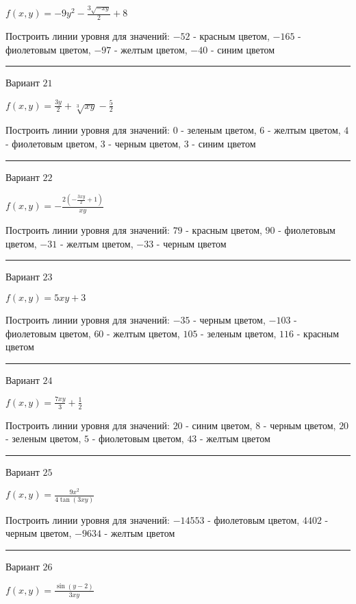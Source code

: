 \documentclass[11pt]{report}
\begin{document}
$f(x, y) = - 9 y^{2} - \frac{3 \sqrt{- x y}}{2} + 8$

Построить линии уровня для значений: $-52$ - красным цветом, $-165$ - фиолетовым цветом, $-97$ - желтым цветом, $-40$ - синим цветом
\begin{center}
\noindent\rule{8cm}{0.4pt}
\end{center}
Вариант $21$


$f(x, y) = \frac{3 y}{2} + \sqrt[3]{x y} - \frac{5}{2}$

Построить линии уровня для значений: $0$ - зеленым цветом, $6$ - желтым цветом, $4$ - фиолетовым цветом, $3$ - черным цветом, $3$ - синим цветом
\begin{center}
\noindent\rule{8cm}{0.4pt}
\end{center}
Вариант $22$


$f(x, y) = - \frac{2 \left(- \frac{3 x y}{2} + 1\right)}{x y}$

Построить линии уровня для значений: $79$ - красным цветом, $90$ - фиолетовым цветом, $-31$ - желтым цветом, $-33$ - черным цветом
\begin{center}
\noindent\rule{8cm}{0.4pt}
\end{center}
Вариант $23$


$f(x, y) = 5 x y + 3$

Построить линии уровня для значений: $-35$ - черным цветом, $-103$ - фиолетовым цветом, $60$ - желтым цветом, $105$ - зеленым цветом, $116$ - красным цветом
\begin{center}
\noindent\rule{8cm}{0.4pt}
\end{center}
Вариант $24$


$f(x, y) = \frac{7 x y}{3} + \frac{1}{2}$

Построить линии уровня для значений: $20$ - синим цветом, $8$ - черным цветом, $20$ - зеленым цветом, $5$ - фиолетовым цветом, $43$ - желтым цветом
\begin{center}
\noindent\rule{8cm}{0.4pt}
\end{center}
Вариант $25$


$f(x, y) = \frac{9 x^{2}}{4 \tan{\left(3 x y \right)}}$

Построить линии уровня для значений: $-14553$ - фиолетовым цветом, $4402$ - черным цветом, $-9634$ - желтым цветом
\begin{center}
\noindent\rule{8cm}{0.4pt}
\end{center}
Вариант $26$


$f(x, y) = \frac{\sin{\left(y - 2 \right)}}{3 x y}$
\end{document}
